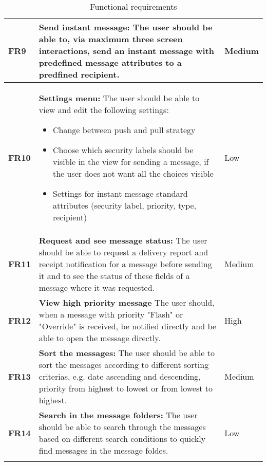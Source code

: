 \begin{longtable}{>{\setlength\hsize{.3\hsize}}X|>{\setlength\hsize{0.9\hsize}}X|>{\setlength\hsize{.3\hsize}}X}
\textbf{FR9} & \textbf{Send instant message:} The user should be able to, via maximum three screen interactions, send an instant message with predefined message attributes to a predfined recipient. & Medium \\ \hline

\textbf{FR10} & \textbf{Settings menu:} The user should be able to view and edit the following settings:
\begin{itemize}
\item{}Change between push and pull strategy
\item{}Choose which security labels should be visible in the view for sending a message, if the user does not want all the choices visible
\item{}Settings for instant message standard attributes (security label, priority, type, recipient)
\end{itemize}  & Low \\ \hline

\textbf{FR11} & \textbf{Request and see message status:} The user should be able to request a delivery report and receipt notification for a message before sending it and to see the status of these fields of a message where it was requested. & Medium \\ \hline

\textbf{FR12} & \textbf{View high priority message} The user should, when a message with priority "Flash" or "Override" is received, be notified directly and be able to open the message directly. & High \\ \hline

\textbf{FR13} & \textbf{Sort the messages:} The user should be able to sort the messages according to different sorting criterias, e.g. date ascending and descending, priority from highest to lowest or from lowest to highest. & Medium \\ \hline

\textbf{FR14} & \textbf{Search in the message folders:} The user should be able to search through the messages based on different search conditions to quickly find messages in the message foldes. & Low \\ \hline

\caption{Functional requirements} \label{tab:functionalrequirements}
\end{longtable}